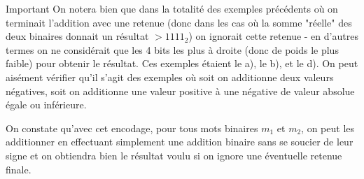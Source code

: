 \documentclass[12pt]{article}
\newenvironment{MaReponse}
		{\begin{greyedtextbox}\itshape} %
		{\end{greyedtextbox}}            %
\newenvironment{alphenum}
{\begin{enumerate}[label=\alph*.]}
	{\end{enumerate}}
\begin{document}
\begin{MaReponse}
\begin{alphenum}
		\begin{MonAmp}{Important}
			On notera bien que dans la totalité des exemples précédents où on terminait l'addition avec une retenue (donc dans les cas où la somme "réelle" des deux binaires donnait un résultat $> 1111_2$) on ignorait cette retenue - en d'autres termes on ne considérait que les 4 bits les plus à droite (donc de poids le plus faible) pour obtenir le résultat. Ces exemples étaient le a), le b), et le d). On peut aisément vérifier qu'il s'agit des exemples où soit on additionne deux valeurs négatives, soit on additionne une valeur positive à une négative de valeur absolue égale ou inférieure.
		\end{MonAmp}
		 
		\end{alphenum}
	\end{MaReponse}
	
	On constate qu'avec cet encodage, pour tous mots binaires $m_1$ et $m_2$, on peut les additionner en effectuant simplement une addition binaire sans se soucier de leur signe et on obtiendra bien le résultat voulu si on ignore une éventuelle retenue finale.
	
\end{document}
